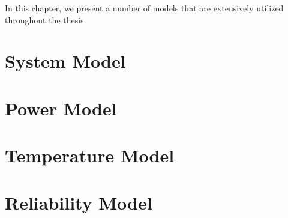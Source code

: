 In this chapter, we present a number of models that are extensively utilized
throughout the thesis.

\section{System Model}

\section{Power Model}

\section{Temperature Model}

\section{Reliability Model}

